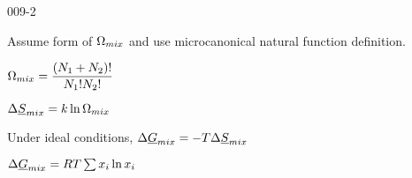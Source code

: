 \begin{mitframe}{009-2}

    
\begin{listone}
        
    \item Assume form of $\combmixfunc$ and use microcanonical natural function definition.
    
    \begin{listtwo}
    
    	\item $\combmixfunc=\dfrac{(\nummoles_1+\nummoles_2)!}{\nummoles_1!\nummoles_2!}$
    	
        \item$\iipf\stressvec_{\mixfunc}=\thermcond\ln\combmixfunc$
        
    
    \end{listtwo}
    
    \item Under ideal conditions, $\iipf\uline{\gibbs}_{\mixfunc}=-\Temp\iipf\uline{\entropy}_{\mixfunc}$
    
    \begin{listtwo}
    	
        \item$\iipf\uline{\gibbs}_{\mixfunc}=\gasconst\Temp\sum\nolimits\specfrac{i}\ln\specfrac{i}$
    
    \end{listtwo}
    
\end{listone}			

\end{mitframe}